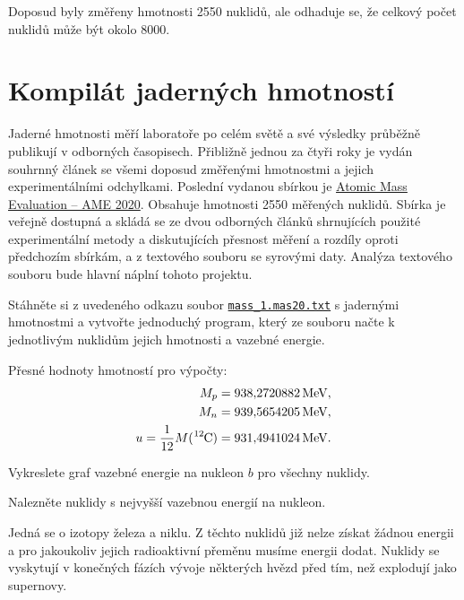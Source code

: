 \documentclass[a4paper,12pt,oneside]{article}
\def\unit#1{\,\mathrm{#1}}
\def\c{,\!}                             %
\def\file#1#2{\textnormal{{\texttt{\href{#1}{#2}}}}}
\theoremstyle{red}
\begin{document}
    Doposud byly změřeny hmotnosti 2550 nuklidů, ale odhaduje se, že celkový počet nuklidů může být okolo 8000.

\section{Kompilát jaderných hmotností}
    Jaderné hmotnosti měří laboratoře po celém světě a své výsledky průběžně publikují v odborných časopisech.
    Přibližně jednou za čtyři roky je vydán souhrnný článek se všemi doposud změřenými hmotnostmi a jejich experimentálními odchylkami.
    Poslední vydanou sbírkou je \href{https://www-nds.iaea.org/amdc/}{Atomic Mass Evaluation -- AME 2020}.
    Obsahuje hmotnosti 2550 měřených nuklidů.
    Sbírka je veřejně dostupná a skládá se ze dvou odborných článků shrnujících použité experimentální metody a diskutujících přesnost měření a rozdíly oproti předchozím sbírkám, a z textového souboru se syrovými daty.
    Analýza textového souboru bude hlavní náplní tohoto projektu.

    \begin{task}
        Stáhněte si z uvedeného odkazu soubor \file{https://www-nds.iaea.org/amdc/ame2020/mass_1.mas20.txt}{mass\_1.mas20.txt} s jadernými hmotnostmi a vytvořte jednoduchý program, který ze souboru načte k jednotlivým nuklidům jejich hmotnosti a vazebné energie.
    \end{task}

    Přesné hodnoty hmotností pro výpočty:
    \begin{align}
        M_{p}&=938\c2720882\unit{MeV},\\
        M_{n}&=939\c5654205\unit{MeV},\\
        u=\frac{1}{12}M(\ce{^{12}C})&=931\c4941024\unit{MeV}.
    \end{align}

    \begin{task}
        \label{task:b}
        Vykreslete graf vazebné energie na nukleon $b$ pro všechny nuklidy.
    \end{task}

    \begin{task}
        Nalezněte nuklidy s nejvyšší vazebnou energií na nukleon.
    \end{task}
    Jedná se o izotopy železa a niklu.
    Z těchto nuklidů již nelze získat žádnou energii a pro jakoukoliv jejich radioaktivní přeměnu musíme energii dodat.
    Nuklidy se vyskytují v konečných fázích vývoje některých hvězd před tím, než explodují jako supernovy.
\end{document}
